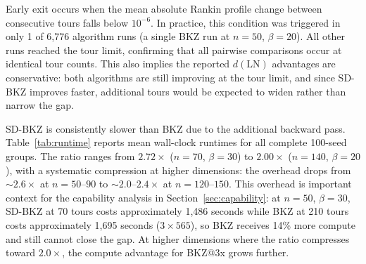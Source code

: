 \documentclass[journal=cic,version=preprint]{iacrj}
\begin{document}
Early exit occurs when the mean absolute Rankin profile change between consecutive tours falls below $10^{-6}$. In practice, this condition was triggered in only 1 of 6{,}776 algorithm runs (a single BKZ run at $n=50$, $\beta=20$). All other runs reached the tour limit, confirming that all pairwise comparisons occur at identical tour counts. This also implies the reported $d(\mathrm{LN})$ advantages are conservative: both algorithms are still improving at the tour limit, and since SD-BKZ improves faster, additional tours would be expected to widen rather than narrow the gap.

SD-BKZ is consistently slower than BKZ due to the additional backward pass. Table~\ref{tab:runtime} reports mean wall-clock runtimes for all complete 100-seed groups. The ratio ranges from $2.72\times$ ($n=70$, $\beta=30$) to $2.00\times$ ($n=140$, $\beta=20$), with a systematic compression at higher dimensions: the overhead drops from ${\sim}2.6\times$ at $n=50$--$90$ to ${\sim}2.0$--$2.4\times$ at $n=120$--$150$. This overhead is important context for the capability analysis in Section~\ref{sec:capability}: at $n=50$, $\beta=30$, SD-BKZ at 70 tours costs approximately 1{,}486 seconds while BKZ at 210 tours costs approximately 1{,}695 seconds ($3\times 565$), so BKZ receives 14\% more compute and still cannot close the gap. At higher dimensions where the ratio compresses toward $2.0\times$, the compute advantage for BKZ@3x grows further.
\end{document}
